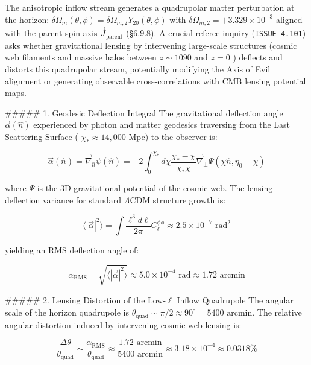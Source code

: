 \documentclass[11pt,a4paper]{article}
\theoremstyle{definition}
\theoremstyle{remark}
\begin{document}
The anisotropic inflow stream generates a quadrupolar matter perturbation at the horizon: $\delta\Omega_m(\theta, \phi) = \delta\Omega_{m, 2} Y_{20}(\theta, \phi)$ with $\delta\Omega_{m, 2} = +3.329 \times 10^{-3}$ aligned with the parent spin axis $\vec{J}_{\text{parent}}$ (\S 6.9.8). A crucial referee inquiry (\texttt{ISSUE-4.101}) asks whether gravitational lensing by intervening large-scale structures (cosmic web filaments and massive halos between $z \sim 1090$ and $z = 0$ ) deflects and distorts this quadrupolar stream, potentially modifying the Axis of Evil alignment or generating observable cross-correlations with CMB lensing potential maps.

\#\#\#\#\# 1. Geodesic Deflection Integral
The gravitational deflection angle $\vec{\alpha}(\hat{n})$ experienced by photon and matter geodesics traversing from the Last Scattering Surface ( $\chi_* \approx 14{,}000$ Mpc) to the observer is:


\begin{equation}
\vec{\alpha}(\hat{n}) = \vec{\nabla}_{\hat{n}} \psi(\hat{n}) = -2 \int_0^{\chi_*} d\chi \frac{\chi_* - \chi}{\chi_* \chi} \vec{\nabla}_\perp \Psi(\chi \hat{n}, \eta_0 - \chi)
\end{equation}


where $\Psi$ is the 3D gravitational potential of the cosmic web.
The lensing deflection variance for standard $\Lambda$CDM structure growth is:


\begin{equation}
\langle |\vec{\alpha}|^2 \rangle = \int \frac{\ell^3 d\ell}{2\pi} C_\ell^{\phi\phi} \approx 2.5 \times 10^{-7}\text{ rad}^2
\end{equation}


yielding an RMS deflection angle of:


\begin{equation}
\alpha_{\text{RMS}} = \sqrt{\langle |\vec{\alpha}|^2 \rangle} \approx 5.0 \times 10^{-4}\text{ rad} \approx 1.72\text{ arcmin}
\end{equation}


\#\#\#\#\# 2. Lensing Distortion of the Low-$\ell$ Inflow Quadrupole
The angular scale of the horizon quadrupole is $\theta_{\text{quad}} \sim \pi/2 \approx 90^\circ = 5400\text{ arcmin}$.
The relative angular distortion induced by intervening cosmic web lensing is:


\begin{equation}
\frac{\Delta\theta}{\theta_{\text{quad}}} \sim \frac{\alpha_{\text{RMS}}}{\theta_{\text{quad}}} \approx \frac{1.72\text{ arcmin}}{5400\text{ arcmin}} \approx 3.18 \times 10^{-4} \approx 0.0318\%
\end{equation}
\end{document}
